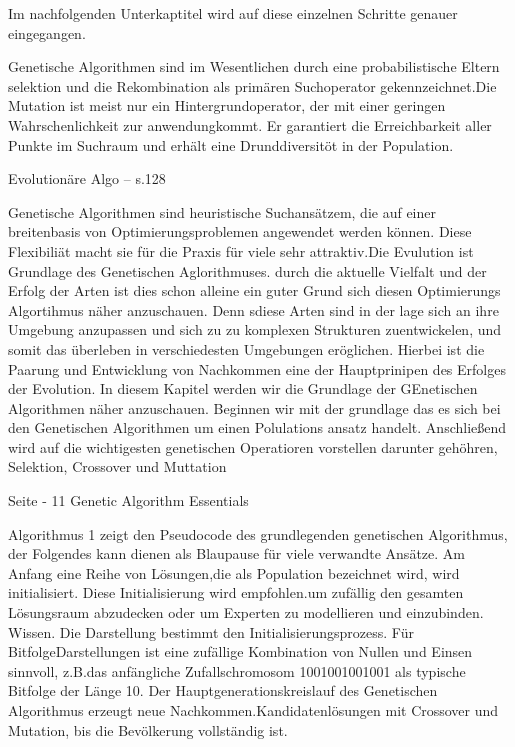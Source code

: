 Im nachfolgenden Unterkaptitel wird auf diese einzelnen Schritte genauer eingegangen.

\fi

\iffalse
Genetische Algorithmen sind im Wesentlichen durch eine probabilistische Eltern selektion und die Rekombination als primären Suchoperator gekennzeichnet.Die Mutation ist meist nur ein Hintergrundoperator, der mit einer geringen Wahrschenlichkeit zur anwendungkommt. Er garantiert die Erreichbarkeit aller Punkte im Suchraum und erhält eine Drunddiversitöt in der Population.

Evolutionäre Algo -- s.128


Genetische Algorithmen sind heuristische Suchansätzem, die auf einer breitenbasis von Optimierungsproblemen angewendet werden können. Diese Flexibiliät macht sie für die Praxis für viele sehr attraktiv.Die Evulution ist Grundlage des Genetischen Aglorithmuses. durch die aktuelle Vielfalt und der Erfolg der Arten ist dies schon alleine ein guter Grund sich diesen Optimierungs Algortihmus näher anzuschauen. Denn sdiese Arten sind in der lage sich an ihre Umgebung anzupassen und sich zu zu komplexen Strukturen zuentwickelen, und somit das überleben in verschiedesten Umgebungen eröglichen. Hierbei ist die Paarung und Entwicklung von Nachkommen eine der Hauptprinipen des Erfolges der Evolution. In diesem Kapitel werden wir die Grundlage der GEnetischen Algorithmen näher anzuschauen. Beginnen wir mit der grundlage das es sich bei den Genetischen Algorithmen um einen Polulations ansatz handelt. Anschließend wird auf die wichtigesten genetischen Operatioren vorstellen darunter gehöhren, Selektion, Crossover und Muttation

Seite - 11 Genetic Algorithm Essentials


Algorithmus 1 zeigt den Pseudocode des grundlegenden genetischen Algorithmus, der Folgendes kann dienen als Blaupause für viele verwandte Ansätze. Am Anfang eine Reihe von Lösungen,die als Population bezeichnet wird, wird initialisiert. Diese Initialisierung wird empfohlen.um zufällig den gesamten Lösungsraum abzudecken oder um Experten zu modellieren und einzubinden. Wissen. Die Darstellung bestimmt den Initialisierungsprozess. Für BitfolgeDarstellungen ist eine zufällige Kombination von Nullen und Einsen sinnvoll, z.B.das anfängliche Zufallschromosom 1001001001001 als typische Bitfolge der Länge 10. Der Hauptgenerationskreislauf des Genetischen Algorithmus erzeugt neue Nachkommen.Kandidatenlösungen mit Crossover und Mutation, bis die Bevölkerung vollständig ist.

